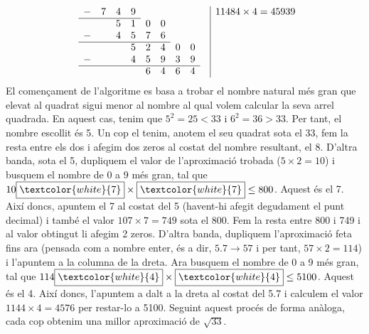 \documentclass[11pt,a4paper]{article}
\theoremstyle{definition}
\begin{document}
\begin{multline*}
\begin{array}{@{\hskip\arraycolsep}*{10}l|l}
                                                   & -  & 7     & 4 & 9 &   &   &   &   &  & 11484\times4=45939 \\
        \cline{2-5}
                                                   &    &       & 5 & 1 & 0 & 0 &   &   &  &                    \\
                                                   & -  &       & 4 & 5 & 7 & 6 &   &   &  &                    \\
        \cline{2-7}
                                                   &    &       &   & 5 & 2 & 4 & 0 & 0 &  &                    \\
                                                   & -  &       &   & 4 & 5 & 9 & 3 & 9 &  &                    \\
        \cline{2-9}
                                                   &    &       &   &   & 6 & 4 & 6 & 4 &  &                    \\
    \end{array}
\end{multline*}
El començament de l'algoritme es basa a trobar el nombre natural més gran que elevat al quadrat sigui menor al nombre al qual volem calcular la seva arrel quadrada. En aquest cas, tenim que $5^2=25<33$ i $6^2=36>33$. Per tant, el nombre escollit és 5. Un cop el tenim, anotem el seu quadrat sota el 33, fem la resta entre els dos i afegim dos zeros al costat del nombre resultant, el 8. D'altra banda, sota el 5, dupliquem el valor de l'aproximació trobada ($5\times 2=10$) i busquem el nombre de 0 a 9 més gran, tal que $10\boxed{\textcolor{white}{7}}\times\boxed{\textcolor{white}{7}}\leq800$. Aquest és el 7. Així doncs, apuntem el 7 al costat del 5 (havent-hi afegit degudament el punt decimal) i també el valor $107\times 7=749$ sota el 800. Fem la resta entre 800 i 749 i al valor obtingut li afegim 2 zeros. D'altra banda, dupliquem l'aproximació feta fins ara (pensada com a nombre enter, és a dir, $5.7\to57$ i per tant, $57\times 2=114$) i l'apuntem a la columna de la dreta. Ara busquem el nombre de 0 a 9 més gran, tal que $114\boxed{\textcolor{white}{4}}\times\boxed{\textcolor{white}{4}}\leq5100$. Aquest és el 4. Així doncs, l'apuntem a dalt a la dreta al costat del 5.7 i calculem el valor $1144\times 4=4576$ per restar-lo a 5100. Seguint aquest procés de forma anàloga, cada cop obtenim una millor aproximació de $\sqrt{33}$.
\end{document}
